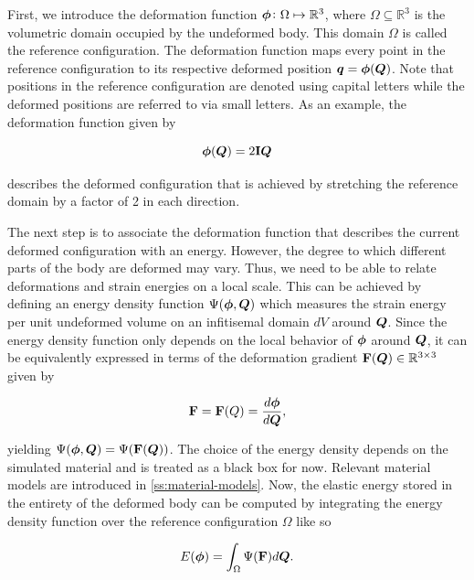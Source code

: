 First, we introduce the deformation function $\bm{\phi} \colon \Omega \mapsto \mathbb{R}^3$, where $\Omega \subseteq \mathbb{R}^3$ is the 
volumetric domain occupied by the undeformed body. This domain $\Omega$ is called the reference configuration. The deformation 
function maps every point in the reference configuration 
to its respective deformed position $\bm{q} = \bm{\phi}(\bm{Q})$. Note that positions in the reference configuration are denoted using capital 
letters while the deformed positions are referred to via small letters. As an example, the deformation function given by 

\[
    \bm{\phi}(\bm{Q}) = 2\mathbf{I}\bm{Q}
\]

\noindent describes the deformed configuration that is achieved by stretching the reference domain by a factor of 2 in each direction. 

The next step is to associate the deformation function that describes the current deformed configuration with an energy. However, the degree to 
which different parts of the body are deformed may vary. Thus, we need to be able to relate deformations and strain energies on a local scale. 
This can be achieved by defining an energy density function $\Psi(\bm{\phi}, \bm{Q})$ which measures the strain energy per unit undeformed volume 
on an infitisemal domain $dV$ around $\bm{Q}$. Since the energy density function only depends on the local behavior of $\bm{\phi}$ around 
$\bm{Q}$, it can be equivalently expressed in terms of the deformation gradient $\mathbf{F}(\bm{Q}) \in \mathbb{R}^{3 \times 3}$ given by 

\begin{equation}\label{eq:deformation-gradient}
    \mathbf{F} = \mathbf{F}(Q) = \frac{d\bm{\phi}}{d\bm{Q}},
\end{equation}

\noindent yielding $\Psi(\bm{\phi}, \bm{Q}) = \Psi(\mathbf{F}(\bm{Q}))$. The choice of the energy density depends on the simulated material and 
is treated as a black box for now. Relevant material models are introduced in \autoref{ss:material-models}. Now, the elastic energy stored in the 
entirety of the deformed body can be computed by integrating the energy density function over the reference configuration $\Omega$ like so

\begin{equation}\label{eq:elastic-energy}
    E(\bm{\phi}) = \int_{\Omega}\Psi(\mathbf{F}) d\bm{Q}.
\end{equation}

